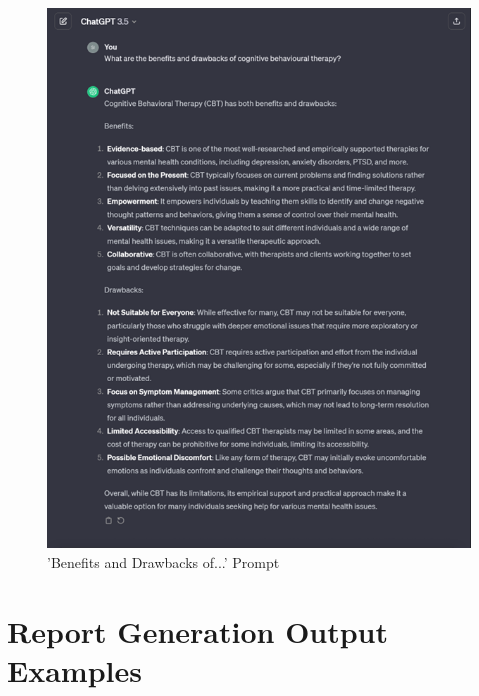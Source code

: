 \documentclass[12pt]{article}
\begin{document}
\begin{figure}[H]
    \centering
    \includegraphics[width=0.9\linewidth]{Images/BenefitsDrawbacksOF_A.png}
    \caption{'Benefits and Drawbacks of...' Prompt}
    \label{fig: BenefitsDrawbacks}
\end{figure}

\section{Report Generation Output Examples}

\label{appendix:report-output}
\end{document}
